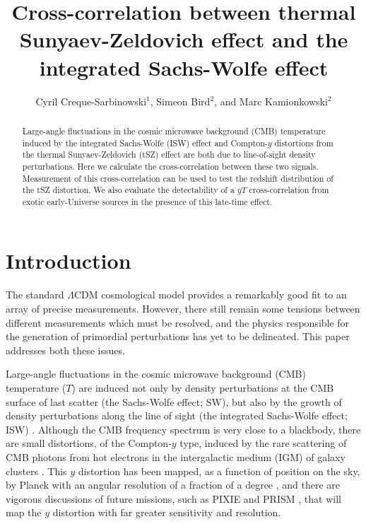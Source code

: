 \documentclass[aps,twocolumn,floats,prd,nofootinbib]{revtex4-1}
\begin{document}
\title{Cross-correlation between thermal Sunyaev-Zeldovich
     effect and the integrated Sachs-Wolfe effect}
\author{Cyril Creque-Sarbinowski$^1$, Simeon Bird$^2$, and Marc
     Kamionkowski$^2$} 

\begin{abstract}
Large-angle fluctuations in the cosmic microwave background
(CMB) temperature induced by the integrated Sachs-Wolfe (ISW)
effect and Compton-$y$ distortions from the thermal
Sunyaev-Zeldovich (tSZ) effect are both due to line-of-sight
density perturbations.  Here we calculate the cross-correlation
between these two signals.  Measurement of this
cross-correlation can be used to test the redshift distribution
of the tSZ distortion.  We also evaluate the detectability of a
$yT$ cross-correlation from exotic early-Universe sources in the
presence of this late-time effect.
\end{abstract}


\maketitle
\section{Introduction}
\label{sec:intro}

The standard $\Lambda$CDM cosmological model provides a
remarkably good fit to an array of precise measurements.
However, there still remain some tensions between different
measurements which must be resolved, and the physics responsible
for the generation of primordial perturbations has yet to be
delineated.  This paper addresses both these issues.

Large-angle fluctuations in the cosmic microwave background
(CMB) temperature ($T$) are induced not only by density perturbations
at the CMB surface of last scatter (the Sachs-Wolfe effect; SW), but
also by the growth of density perturbations along the line of
sight (the integrated Sachs-Wolfe effect; ISW)
\cite{Sachs:1967er}.  Although the
CMB frequency spectrum is very close to a blackbody, there are
small distortions, of the Compton-$y$ type, induced by the rare
scattering of CMB photons from hot
electrons in the intergalactic medium (IGM) of galaxy clusters
\cite{Sunyaev:1972eq}.  This $y$ distortion has been mapped, as
a function of position on the sky, by Planck with an angular
resolution of a fraction of a degree
\cite{Ade:2013qta,Aghanim:2015eva}, and there are vigorous
discussions of future missions, such as PIXIE \cite{Kogut:2011xw}
and PRISM \cite{Andre:2013nfa}, that will map the $y$ distortion
with far greater sensitivity and resolution.
\end{document}
